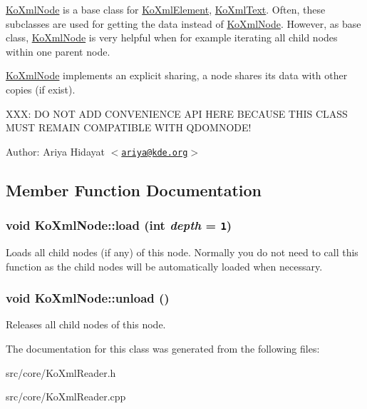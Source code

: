 \hyperlink{classKoXmlNode}{KoXmlNode} is a base class for \hyperlink{classKoXmlElement}{KoXmlElement}, \hyperlink{classKoXmlText}{KoXmlText}. Often, these subclasses are used for getting the data instead of \hyperlink{classKoXmlNode}{KoXmlNode}. However, as base class, \hyperlink{classKoXmlNode}{KoXmlNode} is very helpful when for example iterating all child nodes within one parent node.

\hyperlink{classKoXmlNode}{KoXmlNode} implements an explicit sharing, a node shares its data with other copies (if exist).

XXX: DO NOT ADD CONVENIENCE API HERE BECAUSE THIS CLASS MUST REMAIN COMPATIBLE WITH QDOMNODE!

\begin{Desc}
\item[Author:]Ariya Hidayat $<$\href{mailto:ariya@kde.org}{\tt ariya@kde.org}$>$ \end{Desc}


\subsection{Member Function Documentation}
\hypertarget{classKoXmlNode_00f067df3c054abdb722f3cdf372f58f}{
\subsubsection[{load}]{\setlength{\rightskip}{0pt plus 5cm}void KoXmlNode::load (int {\em depth} = {\tt 1})}}
\label{classKoXmlNode_00f067df3c054abdb722f3cdf372f58f}


Loads all child nodes (if any) of this node. Normally you do not need to call this function as the child nodes will be automatically loaded when necessary. \hypertarget{classKoXmlNode_6db615544f532dec26530d2fe413c946}{
\subsubsection[{unload}]{\setlength{\rightskip}{0pt plus 5cm}void KoXmlNode::unload ()}}
\label{classKoXmlNode_6db615544f532dec26530d2fe413c946}


Releases all child nodes of this node. 

The documentation for this class was generated from the following files:\begin{CompactItemize}
\item 
src/core/KoXmlReader.h\item 
src/core/KoXmlReader.cpp\end{CompactItemize}
